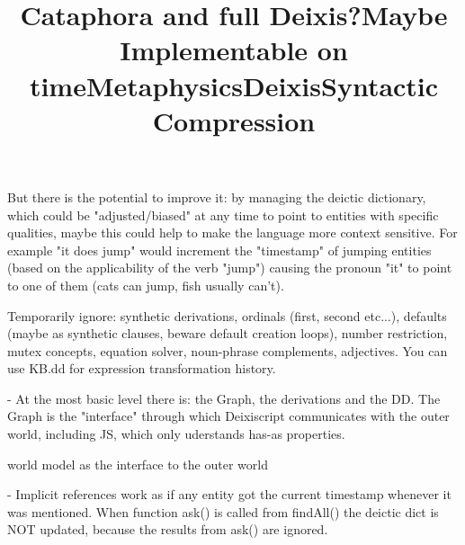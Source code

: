 But there is the potential to improve it: by managing the deictic dictionary, which could be "adjusted/biased" at any time to point to entities with specific qualities, maybe this could help to make the language more context sensitive. For example "it does jump" would increment the "timestamp" of jumping entities (based on the applicability of the verb "jump") causing the pronoun "it" to point to one of them (cats can jump, fish usually can't).

\title{Cataphora and full Deixis?}


\title{Maybe Implementable on time}

Temporarily ignore: synthetic derivations, ordinals (first, second etc...), defaults (maybe as synthetic clauses, beware default creation loops), number restriction, mutex concepts, equation solver, noun-phrase complements, adjectives. You can use KB.dd for expression transformation history.


\title{Metaphysics}

- At the most basic level there is: the Graph, the derivations and the DD. The Graph is the "interface" through which Deixiscript communicates with the outer world, including JS, which only uderstands has-as properties.

world model as the interface to the outer world

\title{Deixis}

- Implicit references work as if any entity got the current timestamp whenever
  it was mentioned. When function ask() is called from findAll() the deictic
  dict is NOT updated, because the results from ask() are ignored.

\title{Syntactic Compression}

